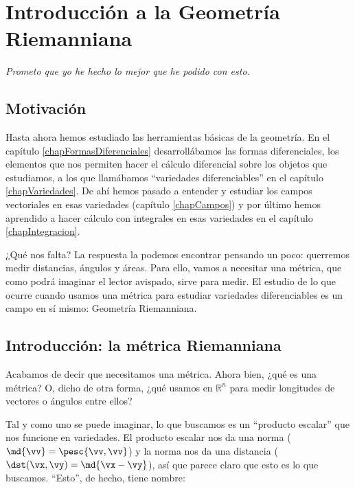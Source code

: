 \chapter{Introducción a la Geometría Riemanniana}

\hfill \textit{Prometo que yo he hecho lo mejor que he podido con esto.}

\section{Motivación}

Hasta ahora hemos estudiado las herramientas básicas de la geometría. En el capítulo \ref{chapFormasDiferenciales} desarrollábamos las formas diferenciales, los elementos que nos permiten hacer el cálculo diferencial sobre los objetos que estudiamos, a los que llamábamos ``variedades diferenciables'' en el capítulo \ref{chapVariedades}. De ahí hemos pasado a entender y estudiar los campos vectoriales en esas variedades (capítulo \ref{chapCampos}) y por último hemos aprendido a hacer cálculo con integrales en esas variedades en el capítulo \ref{chapIntegracion}.

¿Qué nos falta? La respuesta la podemos encontrar pensando un poco: querremos medir distancias, ángulos y áreas. Para ello, vamos a necesitar una métrica, que como podrá imaginar el lector avispado, sirve para medir. El estudio de lo que ocurre cuando usamos una métrica para estudiar variedades diferenciables es un campo en sí mismo: Geometría Riemanniana.

\section{Introducción: la métrica Riemanniana}

Acabamos de decir que necesitamos una métrica. Ahora bien, ¿qué es una métrica? O, dicho de otra forma, ¿qué usamos en $ℝ^n$ para medir longitudes de vectores o ángulos entre ellos?

Tal y como uno se puede imaginar, lo que buscamos es un ``producto escalar'' que nos funcione en variedades. El producto escalar nos da una norma ($\md{\vv} = \pesc{\vv, \vv}$) y la norma nos da una distancia ($\dst(\vx, \vy) = \md{\vx - \vy}$), así que parece claro que esto es lo que buscamos. ``Esto'', de hecho, tiene nombre:

